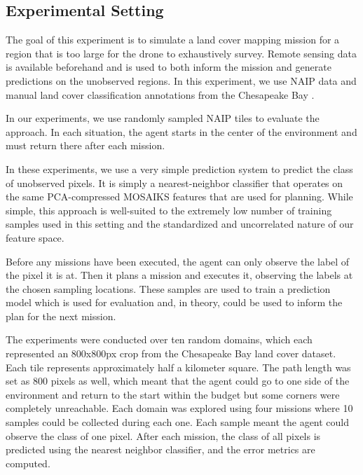\subsection{Experimental Setting}
The goal of this experiment is to simulate a land cover mapping mission for a region that is too large for the drone to exhaustively survey. Remote sensing data is available beforehand and is used to both inform the mission and generate predictions on the unobserved regions. In this experiment, we use NAIP data and manual land cover classification annotations from the Chesapeake Bay \cite{Claggett2014ChesapeakeProduction}.


In our experiments, we use randomly sampled NAIP tiles to evaluate the approach. In each situation, the agent starts in the center of the environment and must return there after each mission.

In these experiments, we use a very simple prediction system to predict the class of unobserved pixels. It is simply a nearest-neighbor classifier that operates on the same PCA-compressed MOSAIKS features that are used for planning. While simple, this approach is well-suited to the extremely low number of training samples used in this setting and the standardized and uncorrelated nature of our feature space.

Before any missions have been executed, the agent can only observe the label of the pixel it is at. Then it plans a mission and executes it, observing the labels at the chosen sampling locations. These samples are used to train a prediction model which is used for evaluation and, in theory, could be used to inform the plan for the next mission. 


The experiments were conducted over ten random domains, which each represented an 800x800px crop from the Chesapeake Bay land cover dataset. Each tile represents approximately half a kilometer square. The path length was set as 800 pixels as well, which meant that the agent could go to one side of the environment and return to the start within the budget but some corners were completely unreachable. Each domain was explored using four missions where 10 samples could be collected during each one. Each sample meant the agent could observe the class of one pixel. After each mission, the class of all pixels is predicted using the nearest neighbor classifier, and the error metrics are computed. 


